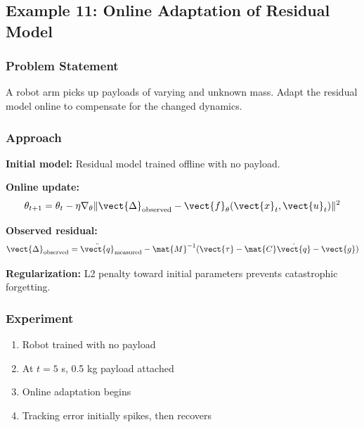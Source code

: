 \subsection{Example 11: Online Adaptation of Residual Model}
\label{ex:online_adaptation}

\subsubsection{Problem Statement}

A robot arm picks up payloads of varying and unknown mass. Adapt the residual model online to compensate for the changed dynamics.

\subsubsection{Approach}

\textbf{Initial model:} Residual model trained offline with no payload.

\textbf{Online update:}
\begin{equation}
\theta_{t+1} = \theta_t - \eta \nabla_\theta \|\vect{\Delta}_{\text{observed}} - \vect{f}_\theta(\vect{x}_t, \vect{u}_t)\|^2
\end{equation}

\textbf{Observed residual:}
\begin{equation}
\vect{\Delta}_{\text{observed}} = \ddot{\vect{q}}_{\text{measured}} - \mat{M}^{-1}(\vect{\tau} - \mat{C}\dot{\vect{q}} - \vect{g})
\end{equation}

\textbf{Regularization:} L2 penalty toward initial parameters prevents catastrophic forgetting.

\subsubsection{Experiment}

\begin{enumerate}
    \item Robot trained with no payload
    \item At $t = 5$ s, 0.5 kg payload attached
    \item Online adaptation begins
    \item Tracking error initially spikes, then recovers
\end{enumerate}

